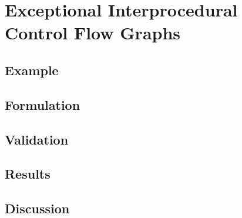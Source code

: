 \section{Exceptional Interprocedural Control Flow Graphs}

\subsection{Example}

\subsection{Formulation}

\subsection{Validation}

\subsection{Results}

\subsection{Discussion}
